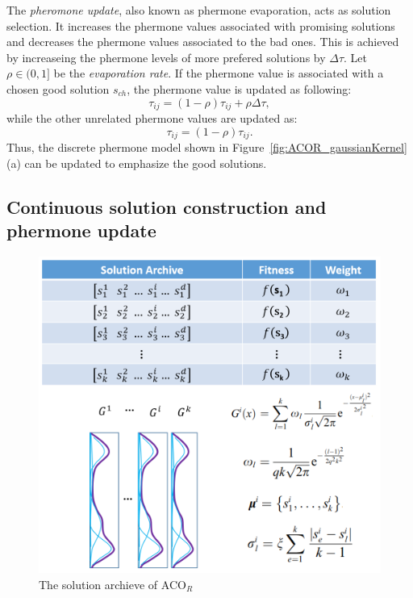The \textit{pheromone update}, also known as phermone evaporation, acts as solution selection.
It increases the phermone values associated with promising solutions and decreases the phermone values associated to the bad ones.
This is achieved by increaseing the phermone levels of more prefered solutions by $\Delta \tau$.
Let $\rho \in (0,1]$ be the \textit{evaporation rate}.
If the phermone value is associated with a chosen good solution $s_{ch}$, the phermone value is updated as following:
\begin{displaymath}
\tau_{ij} = (1 - \rho) \tau_{ij} + \rho \Delta \tau,
\end{displaymath}
while the other unrelated phermone values are updated as:
\begin{displaymath}
\tau_{ij} = (1 - \rho) \tau_{ij}.
\end{displaymath}
Thus, the discrete phermone model shown in Figure~\ref{fig:ACOR_gaussianKernel}(a) can be updated to emphasize the good solutions.


\subsection{Continuous solution construction and phermone update}

\begin{figure}
\centering
\includegraphics[width=\textwidth]{ACOR_solution_archive}
\caption{The solution archieve of ACO$_R$}\label{fig:ACOR_solution_archive}
\end{figure}

